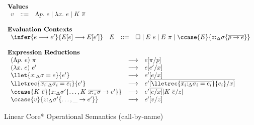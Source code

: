 
\begin{figure}[h]
\begin{framed}
\small
\[
\begin{array}{l}
%
\textbf{Values} \\
\begin{array}{lcl}
    v & ::= & \Lambda p.~e \mid \lambda x.~e \mid K~\overline{v} \\
\end{array}\\\\
%
\textbf{Evaluation Contexts}\\
\begin{array}{llcl}
\infer{e \longrightarrow e'}{E[e] \longrightarrow E[e']} & E & ::= & \square \mid E~e \mid E~\pi \mid \ccase{E}{z{:}_{\Delta}\sigma \{\overline{\rho \to e}\}} \\
\end{array}\\\\
%
\textbf{Expression Reductions}\\
\begin{array}{lcl}
(\Lambda p.~e)~\pi & \longrightarrow & e[\pi/p]\\
%
(\lambda x.~e)~e' & \longrightarrow & e[e'/x]\\
%
\llet{x{:}_\Delta\sigma = e}{e'} & \longrightarrow & e'[e/x]\\
%
\lletrec{\overline{x_i{:}_\Delta\sigma_i = e_i}}{e'} & \longrightarrow &
    e'\overline{[\lletrec{\overline{x_i{:}_\Delta\sigma_i = e_i}}{e_i}/x]}\\
%
\ccase{K~\overline{e}}{z{:}_{\Delta}\sigma' \{\dots, K~\overline{x{:}_\pi\sigma} \to e'\}} &
\longrightarrow & e'\overline{[e/x]}[K~\overline{e}/z]\\
%
\ccase{v}{z{:}_{\Delta}\sigma' \{\dots, \_ \to e'\}} & \longrightarrow & e'[v/z]\\
\end{array}
\end{array}
\]
\end{framed}
\caption{Linear Core* Operational Semantics \small(call-by-name)}
\label{linear-core-operational-semantics}
\end{figure}

